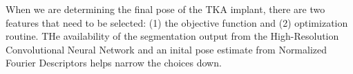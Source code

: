 
When we are determining the final pose of the TKA implant, there are two features that need to be selected: (1) the objective function and (2) optimization routine. THe availability of the segmentation output from the High-Resolution Convolutional Neural Network and an inital pose estimate from Normalized Fourier Descriptors helps narrow the choices down.

